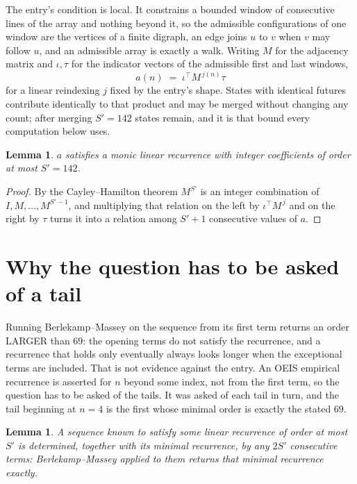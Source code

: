 \documentclass[11pt,a4paper]{article}
\theoremstyle{plain}
\newtheorem{lemma}[theorem]{Lemma}
\theoremstyle{definition}
\begin{document}
The entry's condition is local. It constrains a bounded window of consecutive lines of the
array and nothing beyond it, so the admissible configurations of one window are the vertices of
a finite digraph, an edge joins $u$ to $v$ when $v$ may follow $u$, and an admissible array is
exactly a walk. Writing $M$ for the adjacency matrix and $\iota,\tau$ for the indicator vectors
of the admissible first and last windows,
\[
a(n)\;=\;\iota^{\!\top}M^{\,j(n)}\tau
\]
for a linear reindexing $j$ fixed by the entry's shape. States with identical futures
contribute identically to that product and may be merged without changing any count; after
merging $S'=142$ states remain, and it is that bound every computation below uses.

\begin{lemma}\label{lem:cf}
$a$ satisfies a monic linear recurrence with integer coefficients of order at most $S'=142$.
\end{lemma}

\begin{proof}
By the Cayley--Hamilton theorem $M^{S'}$ is an integer combination of $I,M,\dots,M^{S'-1}$,
and multiplying that relation on the left by $\iota^{\!\top}M^{\,j}$ and on the right by
$\tau$ turns it into a relation among $S'+1$ consecutive values of $a$.
\end{proof}

\section{Why the question has to be asked of a tail}

Running Berlekamp--Massey on the sequence from its first term returns an order LARGER than $69$: the opening terms do not satisfy the recurrence, and a recurrence that holds only eventually always looks longer when the exceptional terms are included. That is not evidence against the entry. An OEIS empirical recurrence is asserted for $n$ beyond some index, not from the first term, so the question has to be asked of the tails. It was asked of each tail in turn, and the tail beginning at $n=4$ is the first whose minimal order is exactly the stated $69$.

\begin{lemma}\label{lem:bm}
A sequence known to satisfy some linear recurrence of order at most $S'$ is determined,
together with its minimal recurrence, by any $2S'$ consecutive terms: Berlekamp--Massey applied
to them returns that minimal recurrence exactly.
\end{lemma}
\end{document}
